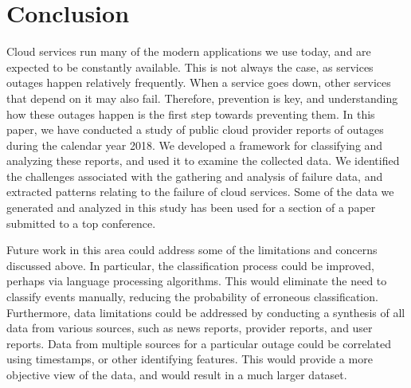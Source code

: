 \section{Conclusion}
Cloud services run many of the modern applications we use today, and are expected to be constantly available.
This is not always the case, as services outages happen relatively frequently.
When a service goes down, other services that depend on it may also fail.
Therefore, prevention is key, and understanding how these outages happen is the first step towards preventing them.
In this paper, we have conducted a study of public cloud provider reports of outages during the calendar year 2018.
We developed a framework for classifying and analyzing these reports, and used it to examine the collected data.
We identified the challenges associated with the gathering and analysis of failure data, and extracted patterns relating to the failure of cloud services.
Some of the data we generated and analyzed in this study has been used for a section of a paper submitted to a top conference.

Future work in this area could address some of the limitations and concerns discussed above.
In particular, the classification process could be improved, perhaps via language processing algorithms.
This would eliminate the need to classify events manually, reducing the probability of erroneous classification.
Furthermore, data limitations could be addressed by conducting a synthesis of all data from various sources, such as news reports, provider reports, and user reports.
Data from multiple sources for a particular outage could be correlated using timestamps, or other identifying features.
This would provide a more objective view of the data, and would result in a much larger dataset.
